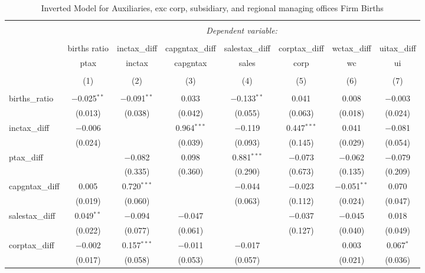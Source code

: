 
\begin{table}[!htbp] \centering 
  \caption{Inverted Model for  Auxiliaries, exc corp, subsidiary, and regional managing offices Firm Births} 
  \label{95rd} 
\footnotesize 
\begin{tabular}{@{\extracolsep{5pt}}lccccccc} 
\\[-1.8ex]\hline 
\hline \\[-1.8ex] 
 & \multicolumn{7}{c}{\textit{Dependent variable:}} \\ 
\cline{2-8} 
\\[-1.8ex] & births ratio & inctax\_diff & capgntax\_diff & salestax\_diff & corptax\_diff & wctax\_diff & uitax\_diff \\ 
 & ptax & inctax & capgntax & sales & corp & wc & ui \\ 
\\[-1.8ex] & (1) & (2) & (3) & (4) & (5) & (6) & (7)\\ 
\hline \\[-1.8ex] 
 births\_ratio & $-$0.025$^{**}$ & $-$0.091$^{**}$ & 0.033 & $-$0.133$^{**}$ & 0.041 & 0.008 & $-$0.003 \\ 
  & (0.013) & (0.038) & (0.042) & (0.055) & (0.063) & (0.018) & (0.024) \\ 
  inctax\_diff & $-$0.006 &  & 0.964$^{***}$ & $-$0.119 & 0.447$^{***}$ & 0.041 & $-$0.081 \\ 
  & (0.024) &  & (0.039) & (0.093) & (0.145) & (0.029) & (0.054) \\ 
  ptax\_diff &  & $-$0.082 & 0.098 & 0.881$^{***}$ & $-$0.073 & $-$0.062 & $-$0.079 \\ 
  &  & (0.335) & (0.360) & (0.290) & (0.673) & (0.135) & (0.209) \\ 
  capgntax\_diff & 0.005 & 0.720$^{***}$ &  & $-$0.044 & $-$0.023 & $-$0.051$^{**}$ & 0.070 \\ 
  & (0.019) & (0.060) &  & (0.063) & (0.112) & (0.024) & (0.047) \\ 
  salestax\_diff & 0.049$^{**}$ & $-$0.094 & $-$0.047 &  & $-$0.037 & $-$0.045 & 0.018 \\ 
  & (0.022) & (0.077) & (0.061) &  & (0.127) & (0.040) & (0.049) \\ 
  corptax\_diff & $-$0.002 & 0.157$^{***}$ & $-$0.011 & $-$0.017 &  & 0.003 & 0.067$^{*}$ \\ 
  & (0.017) & (0.058) & (0.053) & (0.057) &  & (0.021) & (0.036) \\ 

\end{tabular}
\end{table}
